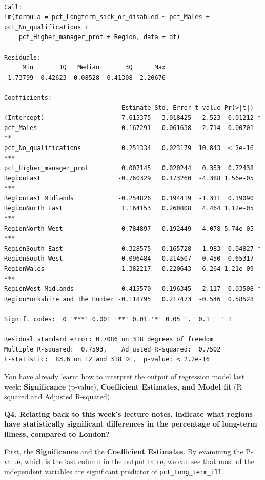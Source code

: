 \documentclass[
  letterpaper,
  DIV=11,
  numbers=noendperiod]{scrreprt}
\begin{document}
\begin{verbatim}

Call:
lm(formula = pct_Longterm_sick_or_disabled ~ pct_Males + pct_No_qualifications + 
    pct_Higher_manager_prof + Region, data = df)

Residuals:
     Min       1Q   Median       3Q      Max 
-1.73799 -0.42623 -0.08528  0.41308  2.20676 

Coefficients:
                                Estimate Std. Error t value Pr(>|t|)    
(Intercept)                     7.615375   3.018425   2.523  0.01212 *  
pct_Males                      -0.167291   0.061638  -2.714  0.00701 ** 
pct_No_qualifications           0.251334   0.023179  10.843  < 2e-16 ***
pct_Higher_manager_prof         0.007145   0.020244   0.353  0.72438    
RegionEast                     -0.760329   0.173260  -4.388 1.56e-05 ***
RegionEast Midlands            -0.254826   0.194419  -1.311  0.19090    
RegionNorth East                1.164153   0.260808   4.464 1.12e-05 ***
RegionNorth West                0.784897   0.192449   4.078 5.74e-05 ***
RegionSouth East               -0.328575   0.165728  -1.983  0.04827 *  
RegionSouth West                0.096484   0.214507   0.450  0.65317    
RegionWales                     1.382217   0.220643   6.264 1.21e-09 ***
RegionWest Midlands            -0.415570   0.196345  -2.117  0.03508 *  
RegionYorkshire and The Humber -0.118795   0.217473  -0.546  0.58528    
---
Signif. codes:  0 '***' 0.001 '**' 0.01 '*' 0.05 '.' 0.1 ' ' 1

Residual standard error: 0.7086 on 318 degrees of freedom
Multiple R-squared:  0.7593,    Adjusted R-squared:  0.7502 
F-statistic:  83.6 on 12 and 318 DF,  p-value: < 2.2e-16
\end{verbatim}

You have already learnt how to interpret the output of regression model
last week: \textbf{Significance} (p-value), \textbf{Coefficient
Estimates, and Model fit} (R squared and Adjusted R-squared).

\textbf{Q4. Relating back to this week's lecture notes, indicate what
regions have statistically significant differences in the percentage of
long-term illness, compared to London?}

First, the \textbf{Significance} and the \textbf{Coefficient Estimates}.
By examining the P-value, which is the last column in the output table,
we can see that most of the independent variables are significant
predictor of \texttt{pct\_Long\_term\_ill}.
\end{document}
